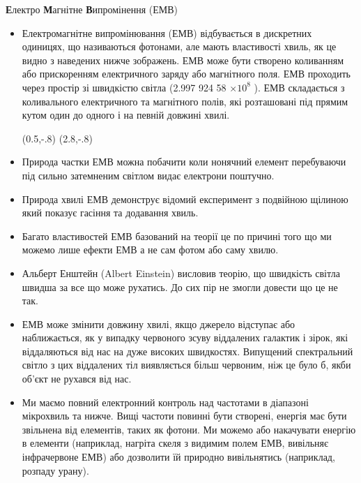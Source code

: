 {\Large {\bfseries Е}лектро {\bfseries М}агнітне {\bfseries В}ипромінення (ЕМВ)}
\begin{itemize}
\item Електромагнітне випромінювання (ЕМВ) відбувається в дискретних одиницях, що називаються фотонами, але мають властивості хвиль, як це видно з наведених нижче зображень. ЕМВ може бути створено коливанням або прискоренням електричного заряду або магнітного поля. ЕМВ проходить через простір зі швидкістю світла (2.997 924 58 $\times 10^{8}$ \metrepersecond ). ЕМВ складається з коливального електричного та магнітного полів, які розташовані під прямим кутом один до одного і на певній довжині хвилі.

(0.5,-.8){}
(2.8,-.8){}

\vspace{2.2in}

\item Природа частки ЕМВ можна побачити коли нонячний елемент перебуваючи під сильно затемненим світлом видає електрони поштучно.

\item Природа хвилі ЕМВ демонструє відомий експеримент з подвійною щілиною який показує гасіння та додавання хвиль.

\item Багато властивостей ЕМВ базований на теорії це по причині того що ми можемо лише ефекти ЕМВ а не сам фотом або саму хвилю.

\item Альберт Енштейн (Albert Einstein) висловив теорію, що швидкість світла швидша за все що може рухатись. До сих пір не змогли довести що це не так.

\item ЕМВ може змінити довжину хвилі, якщо джерело відступає або наближається, як у випадку червоного зсуву віддалених галактик і зірок, які віддаляються від нас на дуже високих швидкостях. Випущений спектральний світло з цих віддалених тіл виявляється більш червоним, ніж це було б, якби об'єкт не рухався від нас.

\item Ми маємо повний електронний контроль над частотами в діапазоні мікрохвиль та нижче. Вищі частоти повинні бути створені,  енергія має бути звільнена від елементів, таких як фотони. Ми можемо або накачувати енергію в елементи (наприклад, нагріта скеля з видимим полем ЕМВ, вивільняє інфрачервоне ЕМВ) або дозволити їй природно вивільнятись (наприклад, розпаду урану).


\end{itemize}
